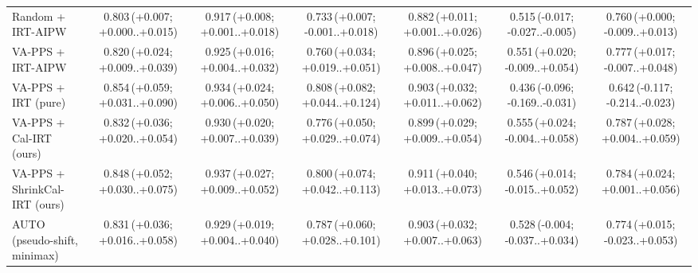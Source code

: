 \begin{tabular}{lcccccc}
Random + IRT-AIPW & 0.803\,\scriptsize(+0.007; +0.000..+0.015) & 0.917\,\scriptsize(+0.008; +0.001..+0.018) & 0.733\,\scriptsize(+0.007; -0.001..+0.018) & 0.882\,\scriptsize(+0.011; +0.001..+0.026) & 0.515\,\scriptsize(-0.017; -0.027..-0.005) & 0.760\,\scriptsize(+0.000; -0.009..+0.013) \\
VA-PPS + IRT-AIPW & 0.820\,\scriptsize(+0.024; +0.009..+0.039) & 0.925\,\scriptsize(+0.016; +0.004..+0.032) & 0.760\,\scriptsize(+0.034; +0.019..+0.051) & 0.896\,\scriptsize(+0.025; +0.008..+0.047) & 0.551\,\scriptsize(+0.020; -0.009..+0.054) & 0.777\,\scriptsize(+0.017; -0.007..+0.048) \\
VA-PPS + IRT (pure) & 0.854\,\scriptsize(+0.059; +0.031..+0.090) & 0.934\,\scriptsize(+0.024; +0.006..+0.050) & 0.808\,\scriptsize(+0.082; +0.044..+0.124) & 0.903\,\scriptsize(+0.032; +0.011..+0.062) & 0.436\,\scriptsize(-0.096; -0.169..-0.031) & 0.642\,\scriptsize(-0.117; -0.214..-0.023) \\
VA-PPS + Cal-IRT (ours) & 0.832\,\scriptsize(+0.036; +0.020..+0.054) & 0.930\,\scriptsize(+0.020; +0.007..+0.039) & 0.776\,\scriptsize(+0.050; +0.029..+0.074) & 0.899\,\scriptsize(+0.029; +0.009..+0.054) & 0.555\,\scriptsize(+0.024; -0.004..+0.058) & 0.787\,\scriptsize(+0.028; +0.004..+0.059) \\
VA-PPS + ShrinkCal-IRT (ours) & 0.848\,\scriptsize(+0.052; +0.030..+0.075) & 0.937\,\scriptsize(+0.027; +0.009..+0.052) & 0.800\,\scriptsize(+0.074; +0.042..+0.113) & 0.911\,\scriptsize(+0.040; +0.013..+0.073) & 0.546\,\scriptsize(+0.014; -0.015..+0.052) & 0.784\,\scriptsize(+0.024; +0.001..+0.056) \\
AUTO (pseudo-shift, minimax) & 0.831\,\scriptsize(+0.036; +0.016..+0.058) & 0.929\,\scriptsize(+0.019; +0.004..+0.040) & 0.787\,\scriptsize(+0.060; +0.028..+0.101) & 0.903\,\scriptsize(+0.032; +0.007..+0.063) & 0.528\,\scriptsize(-0.004; -0.037..+0.034) & 0.774\,\scriptsize(+0.015; -0.023..+0.053) \\
\bottomrule
\end{tabular}
